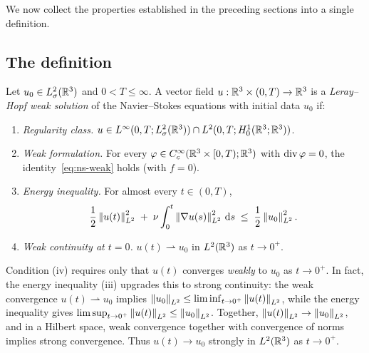 We now collect the properties established in the preceding sections into a single
definition.

\subsection{The definition}

\begin{definition}%
  \label{def:leray-hopf}
  Let $u_{0} \in L^{2}_\sigma(\mathbb{R}^{3})$ and $0 < T \le \infty$.  A vector field
  $u : \mathbb{R}^{3} \times (0, T) \to \mathbb{R}^{3}$ is a \emph{Leray--Hopf weak solution}
  of the Navier--Stokes equations with initial data $u_{0}$ if:
  \begin{enumerate}[label=(\roman*)]
    \item \emph{Regularity class.} $u \in L^{\infty}(0, T; L^{2}_\sigma(\mathbb{R}^{3}))
      \cap L^{2}(0, T; H^{1}_0(\mathbb{R}^{3}; \mathbb{R}^{3}))$.
    \item \emph{Weak formulation.} For every
      $\varphi \in C^\infty_c(\mathbb{R}^{3} \times [0, T); \mathbb{R}^{3})$ with
      $\operatorname{div} \varphi = 0$, the identity~\eqref{eq:ns-weak} holds (with $f = 0$).
    \item \emph{Energy inequality.} For almost every $t \in (0, T)$,
      \[
        \frac{1}{2}\left\lVert u(t) \right\rVert_{L^{2}}^{2}
        \;+\;
        \nu \int_{0}^{t} \left\lVert \nabla u(s) \right\rVert_{L^{2}}^{2} \,\mathrm{d} s
        \;\le\;
        \frac{1}{2}\left\lVert u_{0} \right\rVert_{L^{2}}^{2}.
      \]
    \item \emph{Weak continuity at $t = 0$.}
      $u(t) \rightharpoonup u_{0}$ in $L^{2}(\mathbb{R}^{3})$ as $t \to 0^{+}$.
  \end{enumerate}
\end{definition}

\begin{remark}
  Condition (iv) requires only that $u(t)$ converges \emph{weakly} to $u_{0}$ as
  $t \to 0^{+}$.  In fact, the energy inequality (iii) upgrades this to strong
  continuity: the weak convergence $u(t) \rightharpoonup u_{0}$ implies
  $\left\lVert u_{0} \right\rVert_{L^{2}} \le \liminf_{t \to 0^{+}} \left\lVert u(t) \right\rVert_{L^{2}}$, while the
  energy inequality gives
  $\limsup_{t \to 0^{+}} \left\lVert u(t) \right\rVert_{L^{2}} \le \left\lVert u_{0} \right\rVert_{L^{2}}$.  Together,
  $\left\lVert u(t) \right\rVert_{L^{2}} \to \left\lVert u_{0} \right\rVert_{L^{2}}$, and in a Hilbert space, weak
  convergence together with convergence of norms implies strong convergence.  Thus
  $u(t) \to u_{0}$ strongly in $L^{2}(\mathbb{R}^{3})$ as $t \to 0^{+}$.
\end{remark}

